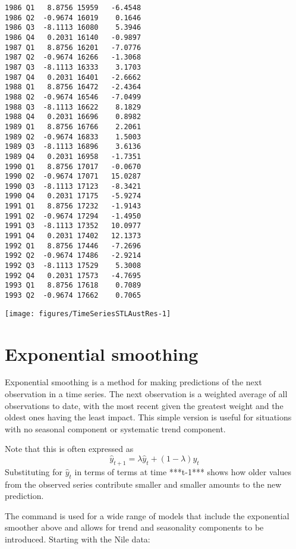 \begin{knitrout}
\begin{kframe}
\begin{verbatim}
1986 Q1   8.8756 15959   -6.4548
1986 Q2  -0.9674 16019    0.1646
1986 Q3  -8.1113 16080    5.3946
1986 Q4   0.2031 16140   -0.9897
1987 Q1   8.8756 16201   -7.0776
1987 Q2  -0.9674 16266   -1.3068
1987 Q3  -8.1113 16333    3.1703
1987 Q4   0.2031 16401   -2.6662
1988 Q1   8.8756 16472   -2.4364
1988 Q2  -0.9674 16546   -7.0499
1988 Q3  -8.1113 16622    8.1829
1988 Q4   0.2031 16696    0.8982
1989 Q1   8.8756 16766    2.2061
1989 Q2  -0.9674 16833    1.5003
1989 Q3  -8.1113 16896    3.6136
1989 Q4   0.2031 16958   -1.7351
1990 Q1   8.8756 17017   -0.0670
1990 Q2  -0.9674 17071   15.0287
1990 Q3  -8.1113 17123   -8.3421
1990 Q4   0.2031 17175   -5.9274
1991 Q1   8.8756 17232   -1.9143
1991 Q2  -0.9674 17294   -1.4950
1991 Q3  -8.1113 17352   10.0977
1991 Q4   0.2031 17402   12.1373
1992 Q1   8.8756 17446   -7.2696
1992 Q2  -0.9674 17486   -2.9214
1992 Q3  -8.1113 17529    5.3008
1992 Q4   0.2031 17573   -4.7695
1993 Q1   8.8756 17618    0.7089
1993 Q2  -0.9674 17662    0.7065
\end{verbatim}
\begin{alltt}
\hlstd{> }
\end{alltt}
\end{kframe}
\texttt{[image: figures/TimeSeriesSTLAustRes-1]} 

\end{knitrout}
 
\section{Exponential smoothing} 
 
Exponential smoothing is a method for making predictions of the next observation in a time series. The next observation is a weighted average of all observations to date, with the most recent given the greatest weight and the oldest ones having the least impact. This simple version is useful for situations with no seasonal component or systematic trend component. 
 
Note that this is often expressed as $$\hat{y}_{t+1} = \lambda \hat{y}_{t} + (1-\lambda)y_{t}$$ 
Substituting for $\hat{y}_t$ in terms of terms at time ***t-1*** shows how older values from the observed series contribute smaller and smaller amounts to the new prediction. 
 
The  command is used for a wide range of models that include the exponential smoother above and allows for trend and seasonality components to be introduced. 
Starting with the Nile data: 
 
